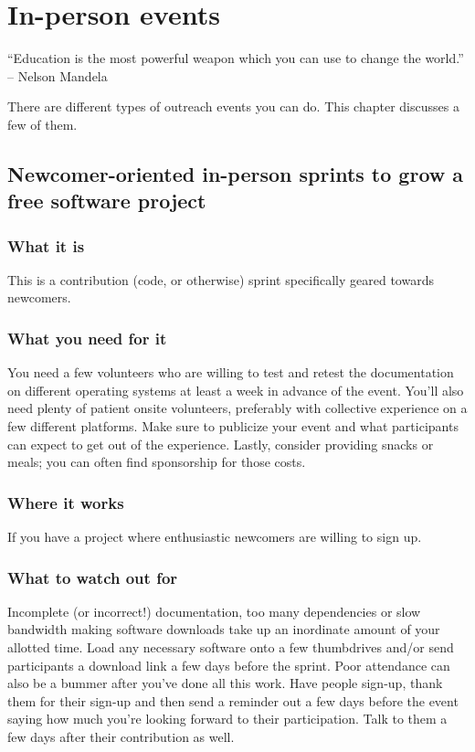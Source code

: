\chapter{In-person events}

“Education is the most powerful weapon which you can use to change the world.” -- Nelson Mandela

There are different types of outreach events you can do. This chapter discusses a few of them. 

\section{Newcomer-oriented in-person sprints to grow a free software project}
\subsection{What it is}
This is a contribution (code, or otherwise) sprint specifically geared towards newcomers.

\subsection{What you need for it}
You need a few volunteers who are willing to test and retest the documentation on different operating systems at least a week in advance of the event. You’ll also need plenty of patient onsite volunteers, preferably with collective experience on a few different platforms. Make sure to publicize your event and what participants can expect to get out of the experience. Lastly, consider providing snacks or meals; you can often find sponsorship for those costs.

\subsection{Where it works}
If you have a project where enthusiastic newcomers are willing to sign up.

\subsection{What to watch out for}
Incomplete (or incorrect!) documentation, too many dependencies or slow bandwidth making software downloads take up an inordinate amount of your allotted time. Load any necessary software onto a few thumbdrives and/or send participants a download link a few days before the sprint. Poor attendance can also be a bummer after you’ve done all this work. Have people sign-up, thank them for their sign-up and then send a reminder out a few days before the event saying how much you’re looking forward to their participation. Talk to them a few days after their contribution as well.

